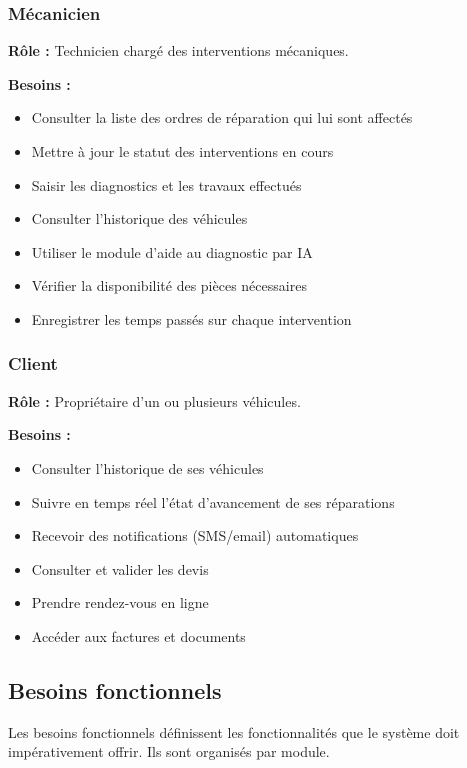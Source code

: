 \subsubsection{Mécanicien}

\textbf{Rôle :} Technicien chargé des interventions mécaniques.

\textbf{Besoins :}
\begin{itemize}
    \item Consulter la liste des ordres de réparation qui lui sont affectés
    \item Mettre à jour le statut des interventions en cours
    \item Saisir les diagnostics et les travaux effectués
    \item Consulter l'historique des véhicules
    \item Utiliser le module d'aide au diagnostic par IA
    \item Vérifier la disponibilité des pièces nécessaires
    \item Enregistrer les temps passés sur chaque intervention
\end{itemize}

\subsubsection{Client}

\textbf{Rôle :} Propriétaire d'un ou plusieurs véhicules.

\textbf{Besoins :}
\begin{itemize}
    \item Consulter l'historique de ses véhicules
    \item Suivre en temps réel l'état d'avancement de ses réparations
    \item Recevoir des notifications (SMS/email) automatiques
    \item Consulter et valider les devis
    \item Prendre rendez-vous en ligne
    \item Accéder aux factures et documents
\end{itemize}

\subsection{Besoins fonctionnels}

Les besoins fonctionnels définissent les fonctionnalités que le système doit impérativement offrir. Ils sont organisés par module.

